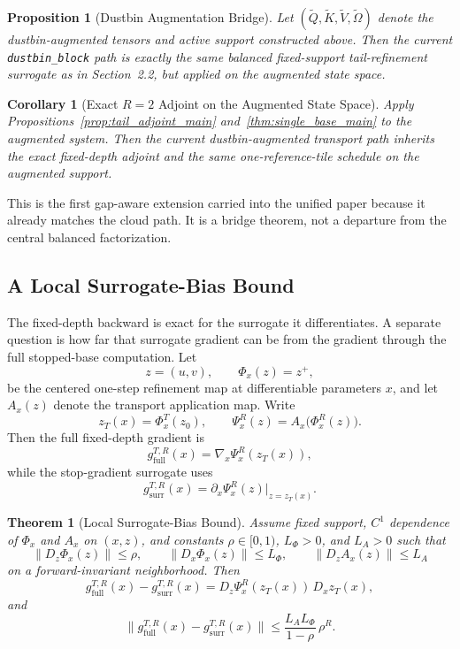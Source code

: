 \documentclass{article}
\newtheorem{theorem}{Theorem}
\newtheorem{proposition}{Proposition}
\newtheorem{corollary}{Corollary}
\begin{document}
\begin{proposition}[Dustbin Augmentation Bridge]\label{thm:dustbin_aug}
Let $(\widetilde Q,\widetilde K,\widetilde V,\widetilde\Omega)$ denote the dustbin-augmented tensors and active support constructed above. Then the current \texttt{dustbin\_block} path is exactly the same balanced fixed-support tail-refinement surrogate as in Section~2.2, but applied on the augmented state space.
\end{proposition}

\begin{corollary}[Exact \texorpdfstring{$R=2$}{R=2} Adjoint on the Augmented State Space]\label{cor:dustbin_r2}
Apply Propositions~\ref{prop:tail_adjoint_main} and~\ref{thm:single_base_main} to the augmented system. Then the current dustbin-augmented transport path inherits the exact fixed-depth adjoint and the same one-reference-tile schedule on the augmented support.
\end{corollary}

This is the first gap-aware extension carried into the unified paper because it already matches the cloud path. It is a bridge theorem, not a departure from the central balanced factorization.

\subsection{A Local Surrogate-Bias Bound}

The fixed-depth backward is exact for the surrogate it differentiates. A separate question is how far that surrogate gradient can be from the gradient through the full stopped-base computation. Let
\[
z=(u,v),\qquad \Phi_x(z)=z^+,
\]
be the centered one-step refinement map at differentiable parameters $x$, and let $A_x(z)$ denote the transport application map. Write
\[
z_T(x)=\Phi_x^T(z_0),
\qquad
\Psi_x^R(z)=A_x\!\bigl(\Phi_x^R(z)\bigr).
\]
Then the full fixed-depth gradient is
\[
g_{\mathrm{full}}^{T,R}(x)=\nabla_x \Psi_x^R(z_T(x)),
\]
while the stop-gradient surrogate uses
\[
g_{\mathrm{surr}}^{T,R}(x)=\partial_x \Psi_x^R(z)\big|_{z=z_T(x)}.
\]

\begin{theorem}[Local Surrogate-Bias Bound]\label{thm:surrogate_bias}
Assume fixed support, $C^1$ dependence of $\Phi_x$ and $A_x$ on $(x,z)$, and constants $\rho\in[0,1)$, $L_\Phi>0$, and $L_A>0$ such that
\[
\|D_z\Phi_x(z)\|\le\rho,
\qquad
\|D_x\Phi_x(z)\|\le L_\Phi,
\qquad
\|D_z A_x(z)\|\le L_A
\]
on a forward-invariant neighborhood. Then
\[
g_{\mathrm{full}}^{T,R}(x)-g_{\mathrm{surr}}^{T,R}(x)
=
D_z\Psi_x^R(z_T(x))\,D_x z_T(x),
\]
and
\[
\bigl\|g_{\mathrm{full}}^{T,R}(x)-g_{\mathrm{surr}}^{T,R}(x)\bigr\|
\le
\frac{L_A L_\Phi}{1-\rho}\,\rho^R.
\]
\end{theorem}
\end{document}
